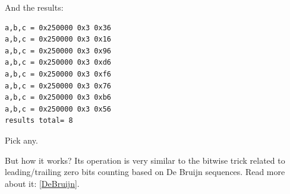 And the results:

\begin{lstlisting}
a,b,c = 0x250000 0x3 0x36
a,b,c = 0x250000 0x3 0x16
a,b,c = 0x250000 0x3 0x96
a,b,c = 0x250000 0x3 0xd6
a,b,c = 0x250000 0x3 0xf6
a,b,c = 0x250000 0x3 0x76
a,b,c = 0x250000 0x3 0xb6
a,b,c = 0x250000 0x3 0x56
results total= 8
\end{lstlisting}

Pick any.

But how it works?
Its operation is very similar to the bitwise trick related to leading/trailing zero bits counting based on De Bruijn sequences.
Read more about it: \ref{DeBruijn}.

